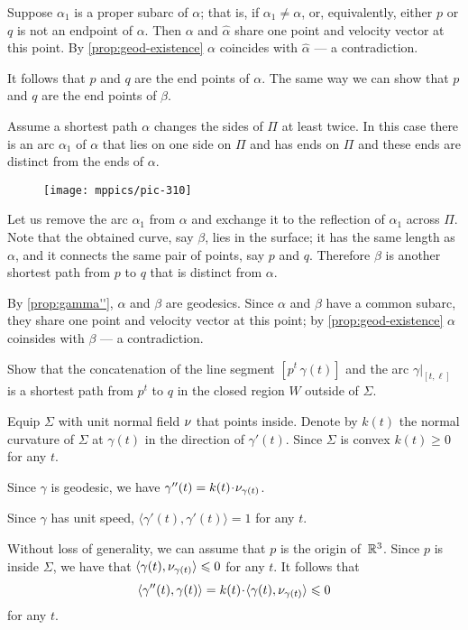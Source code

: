 Suppose $\alpha_1$ is a proper subarc of $\alpha$;
that is, if $\alpha_1\ne\alpha$, or, equivalently, either $p$ or $q$ is not an endpoint of $\alpha$.
Then $\alpha$ and $\hat\alpha$ share one point and velocity vector at this point.
By \ref{prop:geod-existence} $\alpha$ coincides with $\hat\alpha$ --- a contradiction.

It follows that $p$ and $q$ are the end points of $\alpha$.
The same way we can show that $p$ and $q$ are the end points of $\beta$.

Assume a shortest path $\alpha$ changes the sides of $\Pi$ at least twice.
In this case there is an arc $\alpha_1$ of $\alpha$ that lies on one side on $\Pi$ and has ends on $\Pi$ and these ends are distinct from the ends of $\alpha$.

\begin{wrapfigure}{r}{38 mm}
\vskip-0mm
\centering
\texttt{[image: mppics/pic-310]}
\vskip0mm
\end{wrapfigure}

Let us remove the arc $\alpha_1$ from $\alpha$ and exchange it to the reflection of $\alpha_1$ across $\Pi$.
Note that the obtained curve, say $\beta$, lies in the surface; it has the same length as $\alpha$, and it connects the same pair of points, say $p$ and $q$.
Therefore $\beta$ is another shortest path from $p$ to $q$ that is distinct from $\alpha$.

By \ref{prop:gamma''}, $\alpha$ and $\beta$ are geodesics.
Since $\alpha$ and $\beta$ have a common subarc, they share one point and velocity vector at this point;
by \ref{prop:geod-existence} $\alpha$ coinsides with $\beta$ --- a contradiction.



 Show that the concatenation of the line segment $[p^t\,\gamma(t)]$ and the arc $\gamma|_{[t,\ell]}$ is a shortest path from $p^t$ to $q$ in the closed region $W$ outside of $\Sigma$.

Equip $\Sigma$ with unit normal field $\nu$ that points inside.
Denote by $k(t)$ the normal curvature of $\Sigma$ at $\gamma(t)$ in the direction of $\gamma'(t)$.
Since $\Sigma$ is convex $k(t)\ge 0$ for any $t$.

Since $\gamma$ is geodesic, we have $\gamma''(t)=k(t)\cdot\Norm_{\gamma(t)}$.

Since $\gamma$ has unit speed, $\langle\gamma'(t),\gamma'(t)\rangle=1$ for any $t$.

Without loss of generality, we can assume that $p$ is the origin of~$\mathbb{R}^3$.
Since $p$ is inside $\Sigma$, we have that $\langle\gamma(t),\nu_{\gamma(t)}\rangle\leqslant 0$ for any $t$.
It follows that 
\[\langle\gamma''(t),\gamma(t)\rangle=k(t)\cdot \langle\gamma(t),\Norm_{\gamma(t)}\rangle\le 0\]
for any $t$.


